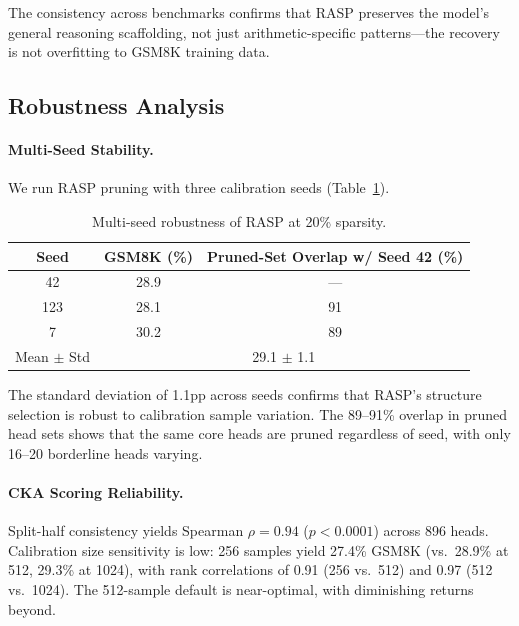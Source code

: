 \documentclass[11pt]{article}
\begin{document}
The consistency across benchmarks confirms that RASP preserves the model's general reasoning scaffolding, not just arithmetic-specific patterns---the recovery is not overfitting to GSM8K training data.


\subsection{Robustness Analysis}
\label{sec:robustness}

\paragraph{Multi-Seed Stability.}
We run RASP pruning with three calibration seeds (Table~\ref{tab:seeds}).

\begin{table}[t]
\centering
\caption{Multi-seed robustness of RASP at 20\% sparsity.}
\label{tab:seeds}
\begin{tabular}{ccc}
\toprule
\textbf{Seed} & \textbf{GSM8K (\%)} & \textbf{Pruned-Set Overlap w/ Seed 42 (\%)} \\
\midrule
42  & 28.9 & --- \\
123 & 28.1 & 91 \\
7   & 30.2 & 89 \\
\midrule
\multicolumn{1}{l}{Mean $\pm$ Std} & \multicolumn{2}{c}{29.1 $\pm$ 1.1} \\
\bottomrule
\end{tabular}
\end{table}

The standard deviation of 1.1pp across seeds confirms that RASP's structure selection is robust to calibration sample variation.
The 89--91\% overlap in pruned head sets shows that the same core heads are pruned regardless of seed, with only 16--20 borderline heads varying.

\paragraph{CKA Scoring Reliability.}
Split-half consistency yields Spearman $\rho = 0.94$ ($p < 0.0001$) across 896 heads.
Calibration size sensitivity is low: 256 samples yield 27.4\% GSM8K (vs.\ 28.9\% at 512, 29.3\% at 1024), with rank correlations of 0.91 (256 vs.\ 512) and 0.97 (512 vs.\ 1024).
The 512-sample default is near-optimal, with diminishing returns beyond.


\end{document}
